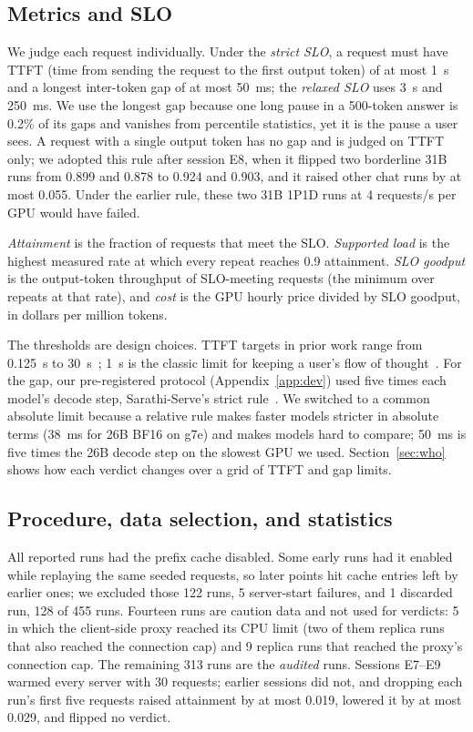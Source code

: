 \documentclass[11pt]{article}
\begin{document}
\subsection{Metrics and SLO}\label{sec:slo}
We judge each request individually. Under the \emph{strict SLO}, a request must have TTFT (time from sending the request to the first output token) of at most 1~s and a longest inter-token gap of at most 50~ms; the \emph{relaxed SLO} uses 3~s and 250~ms. We use the longest gap because one long pause in a 500-token answer is 0.2\% of its gaps and vanishes from percentile statistics, yet it is the pause a user sees. A request with a single output token has no gap and is judged on TTFT only; we adopted this rule after session E8, when it flipped two borderline 31B runs from 0.899 and 0.878 to 0.924 and 0.903, and it raised other chat runs by at most 0.055. Under the earlier rule, these two 31B 1P1D runs at 4 requests/s per GPU would have failed.

\emph{Attainment} is the fraction of requests that meet the SLO. \emph{Supported load} is the highest measured rate at which every repeat reaches 0.9 attainment. \emph{SLO goodput} is the output-token throughput of SLO-meeting requests (the minimum over repeats at that rate), and \emph{cost} is the GPU hourly price divided by SLO goodput, in dollars per million tokens.

The thresholds are design choices. TTFT targets in prior work range from 0.125~s to 30~s~\cite{distserve,mooncake}; 1~s is the classic limit for keeping a user's flow of thought~\cite{nielsen}. For the gap, our pre-registered protocol (Appendix~\ref{app:dev}) used five times each model's decode step, Sarathi-Serve's strict rule~\cite{sarathi}. We switched to a common absolute limit because a relative rule makes faster models stricter in absolute terms (38~ms for 26B BF16 on g7e) and makes models hard to compare; 50~ms is five times the 26B decode step on the slowest GPU we used. Section~\ref{sec:who} shows how each verdict changes over a grid of TTFT and gap limits.

\subsection{Procedure, data selection, and statistics}\label{sec:procedure}
All reported runs had the prefix cache disabled. Some early runs had it enabled while replaying the same seeded requests, so later points hit cache entries left by earlier ones; we excluded those 122 runs, 5 server-start failures, and 1 discarded run, 128 of 455 runs. Fourteen runs are caution data and not used for verdicts: 5 in which the client-side proxy reached its CPU limit (two of them replica runs that also reached the connection cap) and 9 replica runs that reached the proxy's connection cap. The remaining 313 runs are the \emph{audited} runs. Sessions E7--E9 warmed every server with 30 requests; earlier sessions did not, and dropping each run's first five requests raised attainment by at most 0.019, lowered it by at most 0.029, and flipped no verdict.
\end{document}

